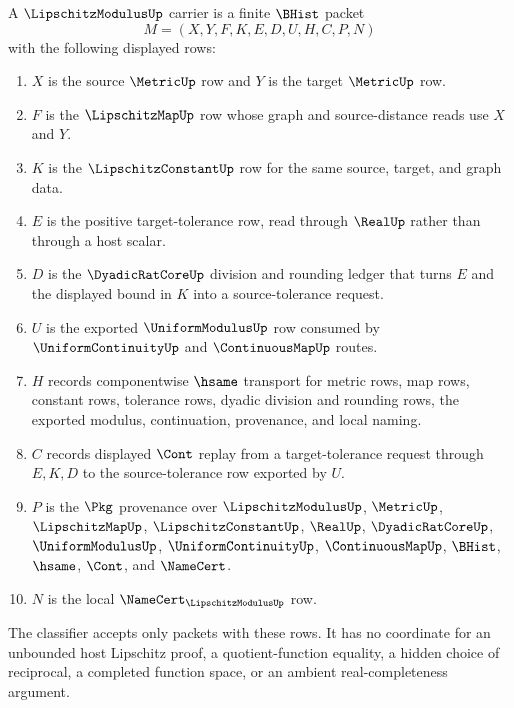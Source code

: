 \begin{definition}\label{def:lipschitz-modulus-carrier}
A $\LipschitzModulusUp$ carrier is a finite $\BHist$ packet
$$
M=(X,Y,F,K,E,D,U,H,C,P,N)
$$
with the following displayed rows:
\begin{enumerate}
\item $X$ is the source $\MetricUp$ row and $Y$ is the target $\MetricUp$ row.
\item $F$ is the $\LipschitzMapUp$ row whose graph and source-distance reads use $X$ and $Y$.
\item $K$ is the $\LipschitzConstantUp$ row for the same source, target, and graph data.
\item $E$ is the positive target-tolerance row, read through $\RealUp$ rather than through a host scalar.
\item $D$ is the $\DyadicRatCoreUp$ division and rounding ledger that turns $E$ and the displayed bound in $K$ into a source-tolerance request.
\item $U$ is the exported $\UniformModulusUp$ row consumed by $\UniformContinuityUp$ and $\ContinuousMapUp$ routes.
\item $H$ records componentwise $\hsame$ transport for metric rows, map rows, constant rows, tolerance rows, dyadic division and rounding rows, the exported modulus, continuation, provenance, and local naming.
\item $C$ records displayed $\Cont$ replay from a target-tolerance request through $E,K,D$ to the source-tolerance row exported by $U$.
\item $P$ is the $\Pkg$ provenance over $\LipschitzModulusUp$, $\MetricUp$, $\LipschitzMapUp$, $\LipschitzConstantUp$, $\RealUp$, $\DyadicRatCoreUp$, $\UniformModulusUp$, $\UniformContinuityUp$, $\ContinuousMapUp$, $\BHist$, $\hsame$, $\Cont$, and $\NameCert$.
\item $N$ is the local $\NameCert_{\LipschitzModulusUp}$ row.
\end{enumerate}
The classifier accepts only packets with these rows. It has no coordinate for an unbounded host Lipschitz proof, a quotient-function equality, a hidden choice of reciprocal, a completed function space, or an ambient real-completeness argument.
\end{definition}

